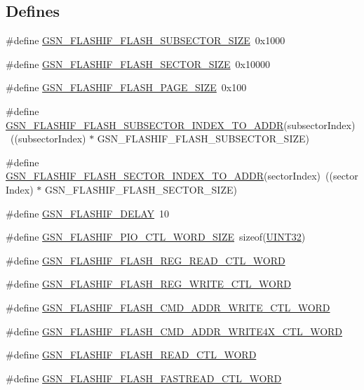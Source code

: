 \subsection*{Defines}
\begin{DoxyCompactItemize}
\item 
\#define \hyperlink{a00501_a3a6d61a1bfa4bbe3f67b3932cf5a2f43}{GSN\_\-FLASHIF\_\-FLASH\_\-SUBSECTOR\_\-SIZE}~0x1000
\item 
\#define \hyperlink{a00501_ac3666fef80e278fcf941e4bb6d09c71a}{GSN\_\-FLASHIF\_\-FLASH\_\-SECTOR\_\-SIZE}~0x10000
\item 
\#define \hyperlink{a00501_aa0142f103c81f61725f292bbe3011531}{GSN\_\-FLASHIF\_\-FLASH\_\-PAGE\_\-SIZE}~0x100
\item 
\#define \hyperlink{a00501_aefc555c38511d4a072fcd5a4a6df00d5}{GSN\_\-FLASHIF\_\-FLASH\_\-SUBSECTOR\_\-INDEX\_\-TO\_\-ADDR}(subsectorIndex)~((subsectorIndex) $\ast$ GSN\_\-FLASHIF\_\-FLASH\_\-SUBSECTOR\_\-SIZE)
\item 
\#define \hyperlink{a00501_a24325d9d6b609d61108779b248b0ddaa}{GSN\_\-FLASHIF\_\-FLASH\_\-SECTOR\_\-INDEX\_\-TO\_\-ADDR}(sectorIndex)~((sectorIndex) $\ast$ GSN\_\-FLASHIF\_\-FLASH\_\-SECTOR\_\-SIZE)
\item 
\#define \hyperlink{a00501_afbf57cb7ab68e072618c64e3f5710edc}{GSN\_\-FLASHIF\_\-DELAY}~10
\item 
\#define \hyperlink{a00501_a4649957b3872f85bd4ef576eb9b3870e}{GSN\_\-FLASHIF\_\-PIO\_\-CTL\_\-WORD\_\-SIZE}~sizeof(\hyperlink{a00660_gae1e6edbbc26d6fbc71a90190d0266018}{UINT32})
\item 
\#define \hyperlink{a00501_a48db0a1a6487d75cc26e47b6ed5aa530}{GSN\_\-FLASHIF\_\-FLASH\_\-REG\_\-READ\_\-CTL\_\-WORD}
\item 
\#define \hyperlink{a00501_a33e15dee99ee2bf69a56f4b01787c0c3}{GSN\_\-FLASHIF\_\-FLASH\_\-REG\_\-WRITE\_\-CTL\_\-WORD}
\item 
\#define \hyperlink{a00501_af14e1b5c6e46794277b498c70f9be271}{GSN\_\-FLASHIF\_\-FLASH\_\-CMD\_\-ADDR\_\-WRITE\_\-CTL\_\-WORD}
\item 
\#define \hyperlink{a00501_af38bcd1228c1bb46d9d949bb2c207027}{GSN\_\-FLASHIF\_\-FLASH\_\-CMD\_\-ADDR\_\-WRITE4X\_\-CTL\_\-WORD}
\item 
\#define \hyperlink{a00501_ae7096c4b9fdda3ba1d4ea1c604c99286}{GSN\_\-FLASHIF\_\-FLASH\_\-READ\_\-CTL\_\-WORD}
\item 
\#define \hyperlink{a00501_a8acd7420fe3b33fb01890420fda65a46}{GSN\_\-FLASHIF\_\-FLASH\_\-FASTREAD\_\-CTL\_\-WORD}
\item 

\end{DoxyCompactItemize}
